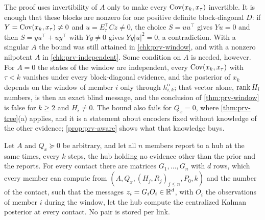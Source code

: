 \begin{remark}\label{rem:prv-window-scope}
The proof uses invertibility of $A$ only to make every $\operatorname{Cov}(x_k,x_\tau)$ invertible. It is enough that these blocks are nonzero for one positive definite block-diagonal $D$: if $Y=\operatorname{Cov}(x_k,x_\tau)\ne0$ and $u=E_\tau^\top Cz\ne0$, the choice $S=uu^\top$ gives $Yu=0$ and then $S=yu^\top+uy^\top$ with $Yy\ne0$ gives $Yy\lvert u\rvert^2=0$, a contradiction. With a singular $A$ the bound was still attained in \cref{chk:prv-window}, and with a nonzero nilpotent $A$ in \cref{chk:prv-independent}. Some condition on $A$ is needed, however. For $A=0$ the states of the window are independent, every $\operatorname{Cov}(x_k,x_\tau)$ with $\tau<k$ vanishes under every block-diagonal evidence, and the posterior of $x_k$ depends on the window of member $i$ only through $h^{\mathrm o}_{i,k}$; that vector alone, $\operatorname{rank} H_i$ numbers, is then an exact blind message, and the conclusion of \cref{thm:prv-window} is false for $k\ge2$ and $H_i\ne0$. The bound also fails for $Q_x=0$, where \cref{thm:prv-tree}(a) applies, and it is a statement about encoders fixed without knowledge of the other evidence; \cref{prop:prv-aware} shows what that knowledge buys.
\end{remark}

\begin{proposition}\label{prop:prv-aware}
Let $A$ and $Q_x\succeq0$ be arbitrary, and let all $n$ members report to a hub at the same times, every $k$ steps, the hub holding no evidence other than the prior and the reports. For every contact there are matrices $G_1,\dots,G_n$ with $d$ rows, which every member can compute from $(A,Q_x,(H_j,R_j)_{j\le n},P_0,k)$ and the number of the contact, such that the messages $z_i=G_iO_i\in\mathbb{R}^d$, with $O_i$ the observations of member $i$ during the window, let the hub compute the centralized Kalman posterior at every contact. No pair is stored per link.
\end{proposition}

